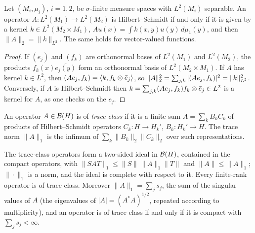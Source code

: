 \begin{proposition}\label{hilbert:prop:HS-kernel}
Let $(M_i,\mu_i)$, $i=1,2$, be $\sigma$-finite measure spaces with $L^2(M_i)$ separable. An
operator $A:L^2(M_1)\to L^2(M_2)$ is Hilbert--Schmidt if and only if it is given by a kernel
$k\in L^2(M_2\times M_1)$, $Au(x)=\int k(x,y)u(y)\,d\mu_1(y)$, and then $\|A\|_2=\|k\|_{L^2}$. The same
holds for vector-valued functions.
\end{proposition}
\begin{proof}
If $(e_j)$ and $(f_k)$ are orthonormal bases of $L^2(M_1)$ and $L^2(M_2)$, the products
$f_k(x)\overline{e_j(y)}$ form an orthonormal basis of $L^2(M_2\times M_1)$. If $A$ has kernel
$k\in L^2$, then $( Ae_j, f_k)=\langle k,f_k\otimes\bar e_j\rangle$, so
$\|A\|_2^2=\sum_{j,k}|( Ae_j, f_k)|^2=\|k\|_{L^2}^2$. Conversely, if $A$ is Hilbert--Schmidt then
$k=\sum_{j,k}( Ae_j, f_k)f_k\otimes\bar e_j\in L^2$ is a kernel for $A$, as one checks on the $e_j$.
\end{proof}

\begin{definition}\label{hilbert:def:trace-class}
An operator $A\in\mathcal{B}(H)$ is of \emph{trace class} if it is a finite sum
$A=\sum_{k}B_kC_k$ of products of Hilbert--Schmidt operators $C_k:H\to H_k'$, $B_k:H_k'\to H$. The
trace norm $\|A\|_1$ is the infimum of $\sum_k\|B_k\|_2\|C_k\|_2$ over such representations.
\end{definition}

The trace-class operators form a two-sided ideal in $\mathcal{B}(H)$, contained in the
compact operators, with $\|SAT\|_1\le\|S\|\,\|A\|_1\|T\|$ and $\|A\|\le\|A\|_1$; $\|\cdot\|_1$ is a norm,
and the ideal is complete with respect to it. Every finite-rank operator is of trace class.
Moreover $\|A\|_1=\sum_js_j$, the sum of the singular values of $A$ (the eigenvalues of
$|A|=(A^*A)^{1/2}$, repeated according to multiplicity), and an operator is of trace class if and only
if it is compact with $\sum_js_j<\infty$.

